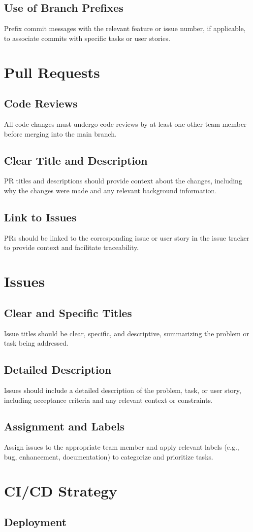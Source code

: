 \documentclass{article}
\begin{document}
\subsection{Use of Branch Prefixes}
Prefix commit messages with the relevant feature or issue number, if applicable, to associate commits with specific tasks or user stories.

\section{Pull Requests}
\subsection{Code Reviews}
All code changes must undergo code reviews by at least one other team member before merging into the main branch.
\subsection{Clear Title and Description}
PR titles and descriptions should provide context about the changes, including why the changes were made and any relevant background information.
\subsection{Link to Issues}
PRs should be linked to the corresponding issue or user story in the issue tracker to provide context and facilitate traceability.

\section{Issues}
\subsection{Clear and Specific Titles}
Issue titles should be clear, specific, and descriptive, summarizing the problem or task being addressed.
\subsection{Detailed Description}
Issues should include a detailed description of the problem, task, or user story, including acceptance criteria and any relevant context or constraints.
\subsection{Assignment and Labels}
Assign issues to the appropriate team member and apply relevant labels (e.g., bug, enhancement, documentation) to categorize and prioritize tasks.

\section{CI/CD Strategy}
\subsection{Deployment}
\end{document}

